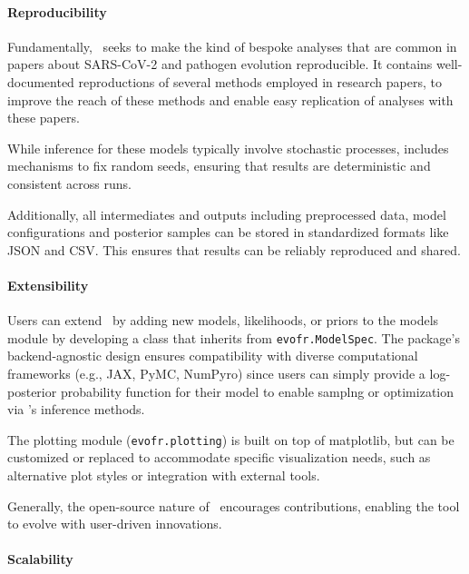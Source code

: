 
\paragraph{Reproducibility}

Fundamentally, \evofr\ seeks to make the kind of bespoke analyses that are common in papers about SARS-CoV-2 and pathogen evolution reproducible.
It contains well-documented reproductions of several methods employed in research papers, to improve the reach of these methods and enable easy replication of analyses with these papers.

While inference for these models typically involve stochastic processes, \evofr includes mechanisms to fix random seeds, ensuring that results are deterministic and consistent across runs.

Additionally, all intermediates and outputs including preprocessed data, model configurations and posterior samples can be stored in standardized formats like JSON and CSV.
This ensures that results can be reliably reproduced and shared.

\paragraph{Extensibility}

Users can extend \evofr\ by adding new models, likelihoods, or priors to the models module by developing a class that inherits from \texttt{evofr.ModelSpec}.
The package’s backend-agnostic design ensures compatibility with diverse computational frameworks (e.g., JAX, PyMC, NumPyro) since users can simply provide a log-posterior probability function for their model to enable samplng or optimization via \evofr's inference methods.

The plotting module (\texttt{evofr.plotting}) is built on top of matplotlib, but can be customized or replaced to accommodate specific visualization needs, such as alternative plot styles or integration with external tools.

Generally, the open-source nature of \evofr\ encourages contributions, enabling the tool to evolve with user-driven innovations.

\paragraph{Scalability}


